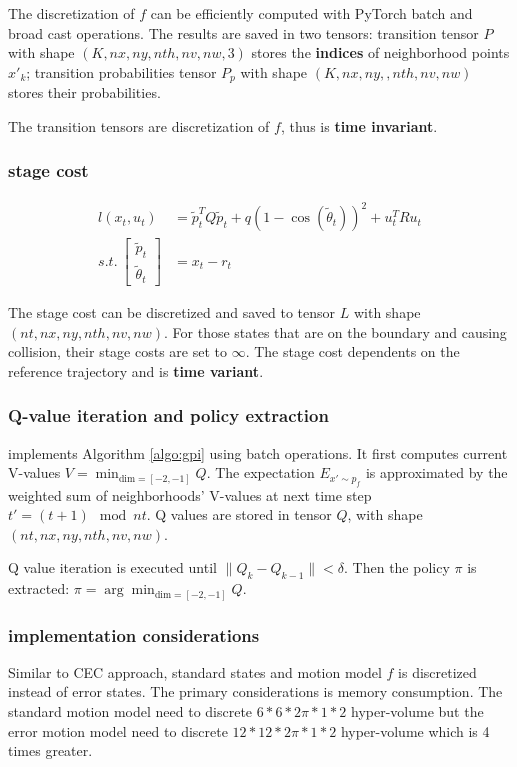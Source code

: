 \documentclass[conference]{IEEEtran}
\begin{document}
The discretization of $f$ can be efficiently computed with PyTorch batch and broad cast operations.
The results are saved in two tensors:
transition tensor $P$ with shape $(K, nx, ny, nth, nv, nw, 3)$ 
stores the \textbf{indices} of neighborhood points $x'_k$;
transition probabilities tensor $P_p$ with shape $(K, nx, ny, ,nth, nv, nw)$ 
stores their probabilities.

The transition tensors are discretization of $f$, thus is \textbf{time invariant}.

\subsubsection{stage cost}
$$
\begin{aligned}
l(x_t, u_t) &= 
    \tilde{p}^{T}_{t}Q\tilde{p}_{t} 
    + q\left( 1-\cos \left( \tilde{\theta}_{t}  \right)  \right)^{2} 
    + u^{T}_{t}Ru_{t} \\
s.t. \ \left[ \begin{gathered}\tilde{p}_{t}\\ \tilde{\theta}_{t} \end{gathered}  \right] 
    &= x_{t}-r_{t}
\end{aligned}
$$

The stage cost can be discretized and saved to tensor $L$ with shape $(nt, nx, ny, nth, nv, nw)$.
For those states that are on the boundary and causing collision, 
their stage costs are set to $\infty$.
The stage cost dependents on the reference trajectory and is \textbf{time variant}.

\subsubsection{Q-value iteration and policy extraction}
implements Algorithm \ref{algo:gpi} using batch operations.
It first computes current V-values $V = \min_{\text{dim}=[-2,-1]} Q$.
The expectation $E_{x' \sim p_f}$ is approximated by the weighted sum of 
neighborhoods' V-values at next time step $t' = (t+1)\mod nt$.
Q values are stored in tensor $Q$, with shape $(nt, nx, ny, nth, nv, nw)$.

Q value iteration is executed until $\|Q_k - Q_{k-1}\| < \delta$.
Then the policy $\pi$ is extracted: $\pi = \arg\min_{\text{dim}=[-2,-1]} Q$.

\subsubsection{implementation considerations}
Similar to CEC approach, 
standard states and motion model $f$ is discretized instead of error states.
The primary considerations is memory consumption.
The standard motion model need to discrete $6*6*2\pi*1*2$ hyper-volume 
but the error motion model need to discrete $12*12*2\pi*1*2$ hyper-volume which is 4 times greater.
\end{document}
